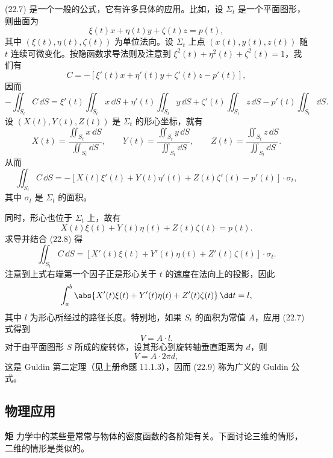 \begin{xremark}
(22.7) 是一个一般的公式，它有许多具体的应用。比如，设 $\Sigma_t$ 是一个平面图形，则曲面为
\[
  \xi(t)x+\eta(t)y+\zeta(t)z=p(t),
\]
其中 $(\xi(t),\eta(t),\zeta(t))$ 为单位法向。设 $\Sigma_t$ 上点 $(x(t),y(t),z(t))$ 随 $t$ 连续可微变化。按隐函数求导法则及注意到 $\xi^2(t)+\eta^2(t)+\zeta^2(t)=1$，我们有
\[
  C=-[\xi'(t)x+\eta'(t)y+\zeta'(t)z-p'(t)],
\]
因而
\[
  -\iint_{S_t}C\,\dd S
  =\xi'(t)\iint_{S_t}x\,\dd S+\eta'(t)\iint_{S_t}y\,\dd S
  +\zeta'(t)\iint_{S_t}z\,\dd S-p'(t)\iint_{S_t}\dd S.
\]
设 $(X(t),Y(t),Z(t))$ 是 $\Sigma_t$ 的形心坐标，就有
\[
  X(t)=\frac{\iint_{S_t}x\,\dd S}{\iint_{S_t}\dd S},\qquad
  Y(t)=\frac{\iint_{S_t}y\,\dd S}{\iint_{S_t}\dd S},\qquad
  Z(t)=\frac{\iint_{S_t}z\,\dd S}{\iint_{S_t}\dd S}.
\]
从而
\begin{equation}
  \iint_{S_t}C\,\dd S
  =-[X(t)\xi'(t)+Y(t)\eta'(t)+Z(t)\zeta'(t)-p'(t)]\cdot\sigma_t,
  \tag{22.8}
  \label{eq:22.8}
\end{equation}
其中 $\sigma_t$ 是 $\Sigma_t$ 的面积。

同时，形心也位于 $\Sigma_t$ 上，故有
\[
  X(t)\xi(t)+Y(t)\eta(t)+Z(t)\zeta(t)=p(t).
\]
求导并结合 (22.8) 得
\[
  \iint_{S_t}C\,\dd S=[X'(t)\xi(t)+Y'(t)\eta(t)+Z'(t)\zeta(t)]\cdot\sigma_t.
\]
注意到上式右端第一个因子正是形心关于 $t$ 的速度在法向上的投影，因此
\[
  \int_a^b\abs{X'(t)\xi(t)+Y'(t)\eta(t)+Z'(t)\zeta(t)}\,\dd t=l,
\]
其中 $l$ 为形心所经过的路径长度。特别地，如果 $S_t$ 的面积为常值 $A$，应用 (22.7) 式得到
\begin{equation}
  V=A\cdot l.
  \tag{22.9}
  \label{eq:22.9}
\end{equation}
对于由平面图形 $S$ 所成的旋转体，设其形心到旋转轴垂直距离为 $d$，则
\[
  V=A\cdot2\pi d,
\]
这是 Guldin 第二定理（见上册命题 11.1.3），因而 (22.9) 称为广义的 Guldin 公式。
\end{xremark}

\subsection{物理应用}

\textbf{矩}
力学中的某些量常常与物体的密度函数的各阶矩有关。下面讨论三维的情形，二维的情形是类似的。

